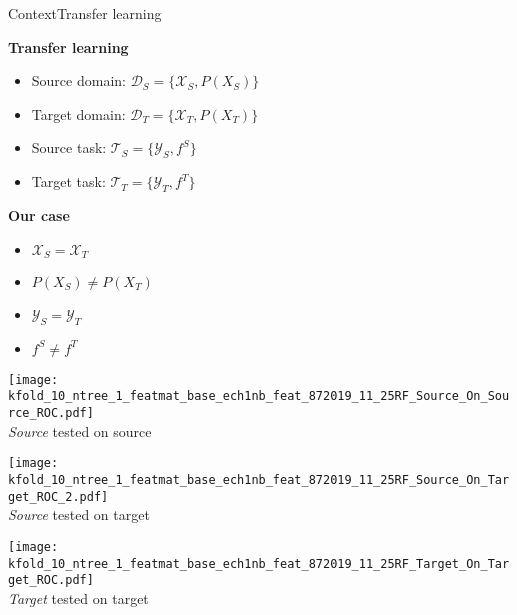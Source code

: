 \begin{frame}{Context}{Transfer learning}
\begin{minipage}[t]{0.49\linewidth}
    \vspace{0pt}
    \textbf{Transfer learning}
    \begin{itemize}
        \item Source domain: $\mathcal{D}_{S} = \{\mathcal{X}_{S}, P(X_{S})\}$\\
        \item Target domain: $\mathcal{D}_{T} = \{\mathcal{X}_{T}, P(X_{T})\}$\\
        \item Source task: $\mathcal{T}_{S} = \{\mathcal{Y}_{S}, f^S\}$\\
        \item Target task: $\mathcal{T}_{T} = \{\mathcal{Y}_{T}, f^T\}$\\
    \end{itemize}
\end{minipage}
\begin{minipage}[t]{0.49\linewidth}
    \vspace{0pt}
    \textbf{Our case}
    \begin{itemize}%
        \item $\mathcal{X}_{S} = \mathcal{X}_{T}$
        \item \textcolor{myorange}{$P(X_{S}) \neq P(X_{T})$}
        \item $\mathcal{Y}_{S} = \mathcal{Y}_{T}$
        \item \textcolor{myorange}{$f^S \neq f^T$}
    \end{itemize}
\end{minipage}

\bigskip

\renewcommand{\ratio}{0.32}
\centering
\begin{minipage}[t]{0.85\linewidth}
    \centering
    \begin{minipage}[t]{\ratio\linewidth}
        \centering
        \texttt{[image: kfold\_10\_ntree\_1\_featmat\_base\_ech1nb\_feat\_872019\_11\_25RF\_Source\_On\_Source\_ROC.pdf]}\\
        {\small \emph{Source} tested on source}
    \end{minipage}
    \begin{minipage}[t]{\ratio\linewidth}
        \centering
        \texttt{[image: kfold\_10\_ntree\_1\_featmat\_base\_ech1nb\_feat\_872019\_11\_25RF\_Source\_On\_Target\_ROC\_2.pdf]}\\
        {\small \emph{Source} tested on target}
    \end{minipage}
    \begin{minipage}[t]{\ratio\linewidth}
        \centering
        \texttt{[image: kfold\_10\_ntree\_1\_featmat\_base\_ech1nb\_feat\_872019\_11\_25RF\_Target\_On\_Target\_ROC.pdf]}\\
        {\small \emph{Target} tested on target}
    \end{minipage}
\end{minipage}


\end{frame}
